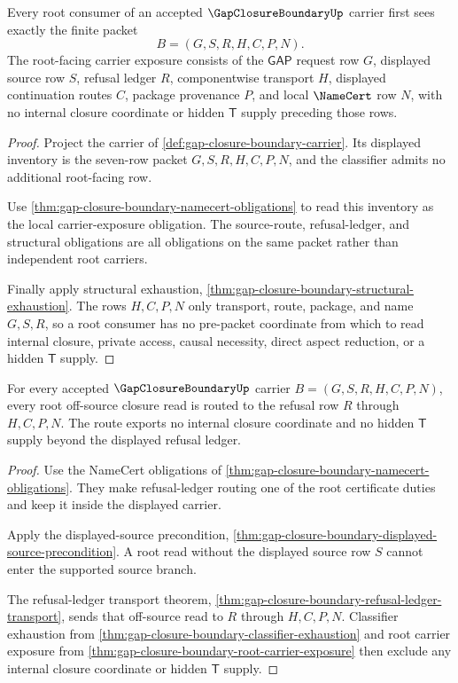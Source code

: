 \begin{theorem}
\label{thm:gap-closure-boundary-root-carrier-exposure}
Every root consumer of an accepted $\GapClosureBoundaryUp$ carrier first sees exactly the finite packet
$$
B=(G,S,R,H,C,P,N).
$$
The root-facing carrier exposure consists of the $\mathsf{GAP}$ request row $G$, displayed source row $S$, refusal ledger $R$, componentwise transport $H$, displayed continuation routes $C$, package provenance $P$, and local $\NameCert$ row $N$, with no internal closure coordinate or hidden $\mathsf{T}$ supply preceding those rows.
\end{theorem}
\begin{proof}
Project the carrier of \autoref{def:gap-closure-boundary-carrier}. Its displayed inventory is the seven-row packet $G,S,R,H,C,P,N$, and the classifier admits no additional root-facing row.

Use \autoref{thm:gap-closure-boundary-namecert-obligations} to read this inventory as the local carrier-exposure obligation. The source-route, refusal-ledger, and structural obligations are all obligations on the same packet rather than independent root carriers.

Finally apply structural exhaustion, \autoref{thm:gap-closure-boundary-structural-exhaustion}. The rows $H,C,P,N$ only transport, route, package, and name $G,S,R$, so a root consumer has no pre-packet coordinate from which to read internal closure, private access, causal necessity, direct aspect reduction, or a hidden $\mathsf{T}$ supply.
\end{proof}

\begin{theorem}
\label{thm:gap-closure-boundary-root-refusal-exhaustion}
For every accepted $\GapClosureBoundaryUp$ carrier $B=(G,S,R,H,C,P,N)$, every root off-source closure read is routed to the refusal row $R$ through $H,C,P,N$. The route exports no internal closure coordinate and no hidden $\mathsf{T}$ supply beyond the displayed refusal ledger.
\end{theorem}
\begin{proof}
Use the NameCert obligations of \autoref{thm:gap-closure-boundary-namecert-obligations}. They make refusal-ledger routing one of the root certificate duties and keep it inside the displayed carrier.

Apply the displayed-source precondition, \autoref{thm:gap-closure-boundary-displayed-source-precondition}. A root read without the displayed source row $S$ cannot enter the supported source branch.

The refusal-ledger transport theorem, \autoref{thm:gap-closure-boundary-refusal-ledger-transport}, sends that off-source read to $R$ through $H,C,P,N$. Classifier exhaustion from \autoref{thm:gap-closure-boundary-classifier-exhaustion} and root carrier exposure from \autoref{thm:gap-closure-boundary-root-carrier-exposure} then exclude any internal closure coordinate or hidden $\mathsf{T}$ supply.
\end{proof}

